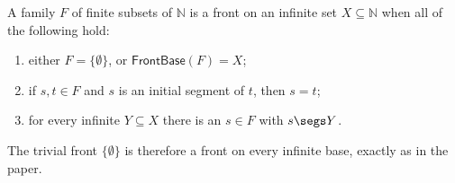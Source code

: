 \begin{definition}
A family $F$ of finite subsets of $\mathbb N$ is a front on an infinite set
$X\subseteq\mathbb N$ when all of the following hold:
\begin{enumerate}
\item either $F=\{\emptyset\}$, or $\mathsf{FrontBase}(F)=X$;
\item if $s,t\in F$ and $s$ is an initial segment of $t$, then $s=t$;
\item for every infinite $Y\subseteq X$ there is an $s\in F$ with
      $s\segs Y$.
\end{enumerate}
The trivial front $\{\emptyset\}$ is therefore a front on every infinite
base, exactly as in the paper.
\end{definition}
